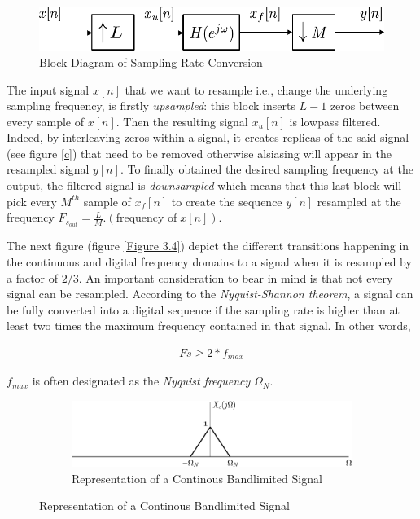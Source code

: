 \begin{figure}[th]
	\centering
	\includegraphics[scale = 0.8]{resampler.pdf}
	\caption{Block Diagram of Sampling Rate Conversion}\label{Figure 3.3}
\end{figure}

The input signal $x[n]$ that we want to resample i.e., change the underlying sampling frequency, is firstly \textit{upsampled}: this block inserts $L-1$ zeros between every sample of $x[n]$. Then the resulting signal $x_u[n]$ is lowpass filtered. Indeed, by interleaving zeros within a signal, it creates replicas of the said signal (see figure \ref{c}) that need to be removed otherwise alsiasing will appear in the resampled signal $y[n]$. To finally obtained the desired sampling frequency at the output, the filtered signal is \textit{downsampled} which means that this last block will pick every $M^{th}$ sample of $x_f[n]$  to create the sequence $y[n]$ resampled at the frequency $F_{s_{out}} = \frac{L}{M}.(\text{frequency of}\; x[n])$.

The next figure (figure \ref{Figure 3.4}) depict the different transitions happening in the continuous and digital frequency domains to a signal when it is resampled by a factor of $2/3$. An important consideration to bear in mind is that not every signal can be resampled. According to the \textit{Nyquist-Shannon theorem}, a signal can be fully converted into a digital sequence if the sampling rate is higher than at least two times the maximum frequency contained in that signal. In other words, 

\begin{align}
	Fs \geqslant 2*f_{max} \label{eqn:Shannon}
\end{align}

$f_{max}$ is often designated as the \textit{Nyquist frequency} $\Omega_N$.

\vspace{1 cm}

\begin{figure}[htb!]
		\centering
		\begin{subfigure}[b]{\textwidth}
			\centering
			\includegraphics[scale=1]{DTFT_resampler_a.pdf}
			\caption{Representation of a Continous Bandlimited Signal}
		\end{subfigure}
	
	
	
\end{figure}
	
